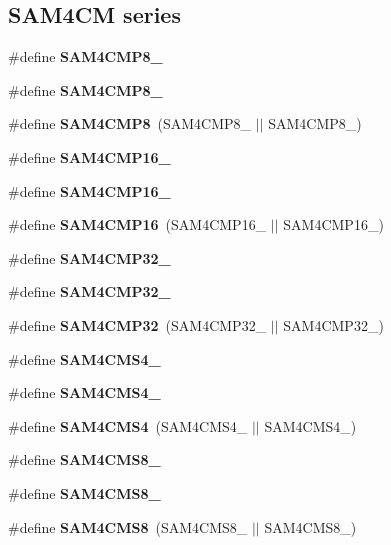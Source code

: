 \subsection*{S\+A\+M4\+C\+M series}
\begin{DoxyCompactItemize}
\item 
\#define {\bfseries S\+A\+M4\+C\+M\+P8\+\_}
\item 
\#define {\bfseries S\+A\+M4\+C\+M\+P8\+\_}
\item 
\hypertarget{group__sam__part__macros__group_gaa4e043324d8d27ea8696a3f7ec2bc418}{}\#define {\bfseries S\+A\+M4\+C\+M\+P8}~(S\+A\+M4\+C\+M\+P8\+\_ $\vert$$\vert$ S\+A\+M4\+C\+M\+P8\+\_)\label{group__sam__part__macros__group_gaa4e043324d8d27ea8696a3f7ec2bc418}

\item 
\#define {\bfseries S\+A\+M4\+C\+M\+P16\+\_}
\item 
\#define {\bfseries S\+A\+M4\+C\+M\+P16\+\_}
\item 
\hypertarget{group__sam__part__macros__group_gab16db9007bc5867acbea45ee0ff90d24}{}\#define {\bfseries S\+A\+M4\+C\+M\+P16}~(S\+A\+M4\+C\+M\+P16\+\_ $\vert$$\vert$ S\+A\+M4\+C\+M\+P16\+\_)\label{group__sam__part__macros__group_gab16db9007bc5867acbea45ee0ff90d24}

\item 
\#define {\bfseries S\+A\+M4\+C\+M\+P32\+\_}
\item 
\#define {\bfseries S\+A\+M4\+C\+M\+P32\+\_}
\item 
\hypertarget{group__sam__part__macros__group_ga136b64aeed2d33cfa1e286fc3c47a606}{}\#define {\bfseries S\+A\+M4\+C\+M\+P32}~(S\+A\+M4\+C\+M\+P32\+\_ $\vert$$\vert$ S\+A\+M4\+C\+M\+P32\+\_)\label{group__sam__part__macros__group_ga136b64aeed2d33cfa1e286fc3c47a606}

\item 
\#define {\bfseries S\+A\+M4\+C\+M\+S4\+\_}
\item 
\#define {\bfseries S\+A\+M4\+C\+M\+S4\+\_}
\item 
\hypertarget{group__sam__part__macros__group_ga96395173bd2abe9fc448dcd7ceeae956}{}\#define {\bfseries S\+A\+M4\+C\+M\+S4}~(S\+A\+M4\+C\+M\+S4\+\_ $\vert$$\vert$ S\+A\+M4\+C\+M\+S4\+\_)\label{group__sam__part__macros__group_ga96395173bd2abe9fc448dcd7ceeae956}

\item 
\#define {\bfseries S\+A\+M4\+C\+M\+S8\+\_}
\item 
\#define {\bfseries S\+A\+M4\+C\+M\+S8\+\_}
\item 
\hypertarget{group__sam__part__macros__group_gae28af08a186248f43e91ff3d12aa57d9}{}\#define {\bfseries S\+A\+M4\+C\+M\+S8}~(S\+A\+M4\+C\+M\+S8\+\_ $\vert$$\vert$ S\+A\+M4\+C\+M\+S8\+\_)\label{group__sam__part__macros__group_gae28af08a186248f43e91ff3d12aa57d9}


\end{DoxyCompactItemize}
